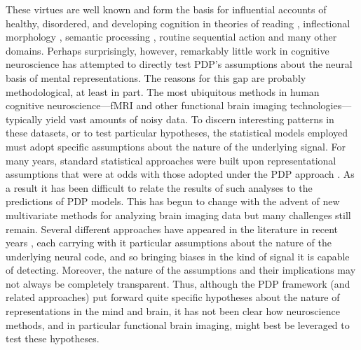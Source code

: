 These virtues are well known and form the basis for influential accounts of healthy, disordered, and developing cognition in theories of reading \cite{seidenberg_distributed_1989,harm_computing_2004}, inflectional morphology \cite{RumelhartMcClelland86pt,JoanisseSeidenberg99, plunkett_connectionist_1999}, semantic processing \cite{FarahMcClelland91,rogers_semantic_2004,rogers_structure_2004}, routine sequential action \cite{BotvinickPlaut2004} and many other domains. Perhaps surprisingly, however, remarkably little work in cognitive neuroscience has attempted to directly test PDP's assumptions about the neural basis of mental representations. The reasons for this gap are probably methodological, at least in part. The most ubiquitous methods in human cognitive neuroscience---fMRI and other functional brain imaging technologies---typically yield vast amounts of noisy data.  To discern interesting patterns in these datasets, or to test particular hypotheses, the statistical models employed must adopt specific assumptions about the nature of the underlying signal. For many years, standard statistical approaches were built upon representational assumptions that were at odds with those adopted under the PDP approach \cite{kriegeskorte_representational_2008}. As a result it has been difficult to relate the results of such analyses to the predictions of PDP models. This has begun to change with the advent of new multivariate methods for analyzing brain imaging data but many challenges still remain. Several different approaches have appeared in the literature in recent years \cite{pereira_machine_2009,kriegeskorte_information-based_2006,kriegeskorte_representational_2013,mitchell_predicting_2008}, each carrying with it particular assumptions about the nature of the underlying neural code, and so bringing biases in the kind of signal it is capable of detecting. Moreover, the nature of the assumptions and their implications may not always be completely transparent. Thus, although the PDP framework (and related approaches) put forward quite specific hypotheses about the nature of representations in the mind and brain, it has not been clear how neuroscience methods, and in particular functional brain imaging, might best be leveraged to test these hypotheses.

